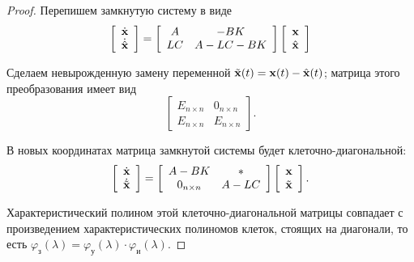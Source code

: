 \documentclass[a4paper,14pt]{article}
\theoremstyle{definition}
\begin{document}
\begin{proof}
  Перепишем замкнутую систему в виде
  \begin{equation*}
    \left[%
    \begin{array}{c}
      \dot{\vb{x}} \\
      \dot{\hat{\vb{x}}}
    \end{array}
    \right]
    =
    \left[
    \begin{array}{cc}
      A & -BK \\
      LC & A - LC - BK
    \end{array}
    \right]
    \left[
    \begin{array}{c}
      \vb{x} \\
      \hat{\vb{x}}
    \end{array}
    \right]
  \end{equation*}

  Сделаем невырожденную замену переменной $\tilde{\vb{x}}(t) = \vb{x}(t) - \hat{\vb{x}}(t)$; матрица
  этого преобразования имеет вид
  \begin{equation*}
    \left[
    \begin{array}{cc}
      E_{n \times n} & 0_{n \times n} \\
      E_{n \times n} & E_{n \times n}
    \end{array}
    \right].
  \end{equation*}
  
  В новых координатах матрица замкнутой системы будет клеточно-диагональной:
  \begin{equation*}
    \left[
    \begin{array}{c}
      \dot{\vb{x}} \\
      \dot{\tilde{\vb{x}}}
    \end{array}
    \right]
    =
    \left[
    \begin{array}{cc}
      A - BK & \ast \\
      0_{n \times n} & A - LC
    \end{array}
    \right]
    \left[
    \begin{array}{c}
      \vb{x} \\
      \tilde{\vb{x}}
    \end{array}
    \right].
  \end{equation*}

  Характеристический полином этой клеточно-диагональной матрицы совпадает с произведением характеристических полиномов
  клеток, стоящих на диагонали, то есть $\varphi_{\text{з}}(\lambda) = \varphi_{\text{у}}(\lambda) \cdot \varphi_{\text{и}}(\lambda)$.
\end{proof}
\end{document}
